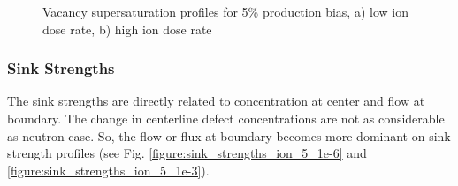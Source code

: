 \documentclass[a4paper]{article}
\begin{document}
\begin{figure}[h!]
        \caption{Vacancy supersaturation profiles for 5\% production bias, a) low ion dose rate, b) high ion dose rate}
        \label{figure:vacancy_supersaturation_ion_5}
      \end{figure}
      \newpage
    \subsubsection{Sink Strengths} \hspace{10pt}
    The sink strengths are directly related to concentration at center and flow at boundary. The change in centerline defect concentrations are not as considerable as neutron case. So, the flow or flux at boundary becomes more dominant on sink strength profiles (see Fig. \ref{figure:sink_strengths_ion_5_1e-6} and \ref{figure:sink_strengths_ion_5_1e-3}).
\end{document}
